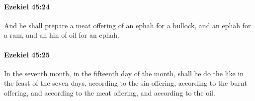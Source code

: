		\paragraph{Ezekiel 45:24} %
			\label{EZEKIEL-45-24}

			And he shall prepare a meat offering of an ephah for a bullock, and an ephah for a ram, and an hin of oil for an ephah.


		\paragraph{Ezekiel 45:25} %
			\label{EZEKIEL-45-25}

			In the seventh month, in the fifteenth day of the month, shall he do the like in the feast of the seven days, according to the sin offering, according to the burnt offering, and according to the meat offering, and according to the oil.

